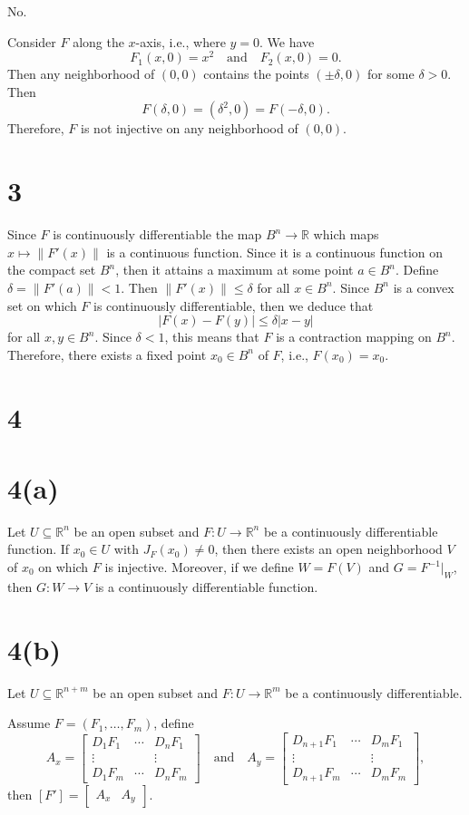 \documentclass[12pt]{article}
\newcommand{\isp}[1]{\quad\text{#1}\quad}
\newcommand{\R}{\mathbb{R}}
\newcommand{\<}{\langle}
\renewcommand{\>}{\rangle}
\newcommand{\mat}[1]{\begin{bmatrix}#1\end{bmatrix}}
\begin{document}
No.

Consider $F$ along the $x$-axis, i.e., where $y = 0$. We have
\[
    F_1(x, 0) = x^2 \isp{and} F_2(x, 0) = 0.
\]
Then any neighborhood of $(0, 0)$ contains the points $(\pm\delta, 0)$ for some $\delta > 0$. Then
\[
    F(\delta, 0) = (\delta^2, 0) = F(-\delta, 0).
\]
Therefore, $F$ is not injective on any neighborhood of $(0, 0)$.


\newpage
\section*{3}

Since $F$ is continuously differentiable the map $B^n \to \R$ which maps $x \mapsto \|F'(x)\|$ is a continuous function. Since it is a continuous function on the compact set $B^n$, then it attains a maximum at some point $a \in B^n$. Define $\delta = \|F'(a)\| < 1$. Then $\|F'(x)\| \leq \delta$ for all $x \in B^n$. Since $B^n$ is a convex set on which $F$ is continuously differentiable, then we deduce that
\[
    |F(x) - F(y)| \leq \delta|x - y|
\]
for all $x, y \in B^n$. Since $\delta < 1$, this means that $F$ is a contraction mapping on $B^n$. Therefore, there exists a fixed point $x_0 \in B^n$ of $F$, i.e., $F(x_0) = x_0$.

\newpage
\section*{4}

\section*{4(a)}

Let $U \subseteq \R^n$ be an open subset and $F : U \to \R^n$ be a continuously differentiable function. If $x_0 \in U$ with $J_F(x_0) \ne 0$, then there exists an open neighborhood $V$ of $x_0$ on which $F$ is injective. Moreover, if we define $W = F(V)$ and $G = F^{-1}|_{W}$, then $G : W \to V$ is a continuously differentiable function.

\section*{4(b)}

Let $U \subseteq \R^{n+m}$ be an open subset and $F : U \to \R^m$ be a continuously differentiable.

Assume $F =(F_1, \dots, F_m)$, define
\[
    A_x = \mat{D_1F_1 & \cdots & D_n F_1 \\ \vdots & & \vdots \\ D_1F_m & \cdots & D_nF_m}
    \isp{and}
    A_y = \mat{D_{n+1}F_1 & \cdots & D_m F_1 \\ \vdots & & \vdots \\ D_{n+1}F_m & \cdots & D_mF_m},
\]
then $[F'] = \mat{A_x & A_y}$.
\end{document}
